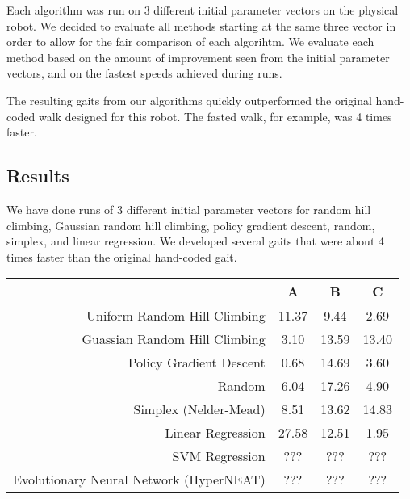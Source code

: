 Each algorithm was run on 3 different initial parameter vectors on the
physical robot. We decided to evaluate all methods starting at the
same three vector in order to allow for the fair comparison of each
algorihtm.  We evaluate
each method based on the amount of improvement seen from the initial
parameter vectors, and on the fastest speeds achieved during runs.

The resulting gaits from our algorithms quickly outperformed the original
hand-coded walk designed for this robot. The fasted walk, for example, was
4 times faster.

\subsection{Results}

We have done runs of 
3 different initial parameter vectors for random hill climbing, 
Gaussian random hill climbing, policy gradient descent, random,
simplex, and linear regression. We developed several
gaits that were about 4 times faster than the original hand-coded gait. 



\begin{tabular}{|r|c|c|c|}
\hline
                                         & A       & B      & C      \\
\hline
Uniform Random Hill Climbing             & 11.37   & 9.44   & 2.69   \\
\hline
Guassian Random Hill Climbing            & 3.10    & 13.59  & 13.40  \\
\hline
Policy Gradient Descent                  & 0.68    & 14.69  & 3.60   \\
\hline
Random                                   & 6.04    & 17.26  & 4.90   \\
\hline
Simplex (Nelder-Mead)                    & 8.51    & 13.62  & 14.83  \\
\hline
Linear Regression                        & 27.58   & 12.51  & 1.95   \\
\hline
SVM Regression                           & ???     & ???    & ???    \\
\hline
Evolutionary Neural Network (HyperNEAT)  & ???     & ???    & ???    \\
\hline
\end{tabular}



